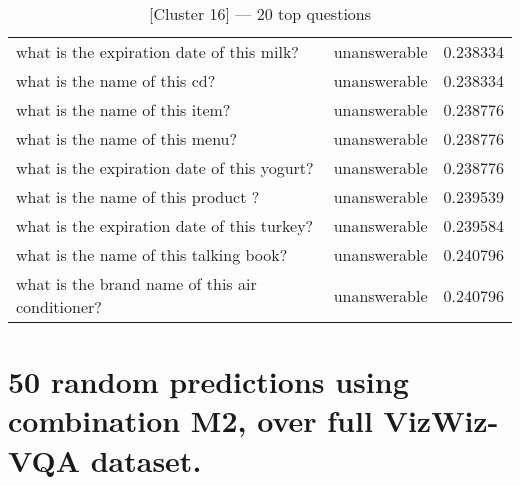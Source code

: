 \begin{table}[!th]
{\begin{tabular}{lcr}
			what is the expiration date of this milk?                  & unanswerable         & 0.238334          \\
			what is the name of this cd?                               & unanswerable         & 0.238334          \\
			what is the name of this item?                             & unanswerable         & 0.238776          \\
			what is the name of this menu?                             & unanswerable         & 0.238776          \\
			what is the expiration date of this yogurt?                & unanswerable         & 0.238776          \\
			what is the name of this product ?                         & unanswerable         & 0.239539          \\
			what is the expiration date of this turkey?                & unanswerable         & 0.239584          \\
			what is the name of this talking book?                     & unanswerable         & 0.240796          \\
			what is the brand name of this air conditioner?            & unanswerable         & 0.240796          \\
			\bottomrule
		\end{tabular}}
	\caption{[Cluster 16] --- 20 top questions}
	\vspace{-5mm}
\end{table}


\onecolumn
\section{50 random predictions using combination M2, over full VizWiz-VQA dataset.}
\label{app:classification_samples}

